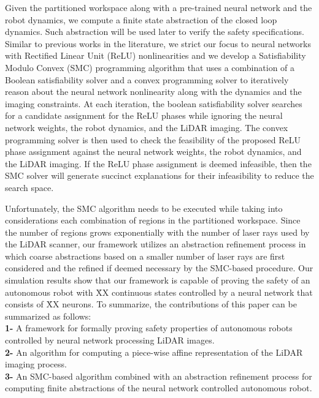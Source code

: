 
Given the partitioned workspace along with a pre-trained neural network and the robot dynamics, we compute a finite state abstraction of the closed loop dynamics. Such abstraction will be used later to verify the safety specifications. Similar to previous works in the literature, we strict our focus to neural networks with Rectified Linear Unit (ReLU) nonlinearities and we develop a Satisfiability Modulo Convex (SMC) programming algorithm that uses a combination of a Boolean satisfiability solver and a convex programming solver to iteratively reason about the neural network nonlinearity along with the dynamics and the imaging constraints. At each iteration, the boolean satisfiability solver searches for a candidate assignment for the ReLU phases while ignoring the neural network weights, the robot dynamics, and the LiDAR imaging. The convex programming solver is then used to check the feasibility of the proposed ReLU phase assignment against the neural network weights, the robot dynamics, and the LiDAR imaging. If the ReLU phase assignment is deemed infeasible, then the SMC solver will generate succinct explanations for their infeasibility to reduce the search space. 

Unfortunately, the SMC algorithm needs to be executed while taking into considerations each combination of regions in the partitioned workspace. Since the number of regions grows exponentially with the number of laser rays used by the LiDAR scanner, our framework utilizes an abstraction refinement process in which coarse abstractions based on a smaller number of laser rays are first considered and the refined if deemed necessary by the SMC-based procedure. Our simulation results show that our framework is capable of proving the safety of an autonomous robot with \r{XX} continuous states controlled by a neural network that consists of \r{XX} neurons. To summarize, the contributions of this paper can be summarized as follows:\\
\textbf{1-} A framework for formally proving safety properties of autonomous robots controlled by neural network processing LiDAR images.\\
\textbf{2-} An algorithm for computing a piece-wise affine representation of the LiDAR imaging process. \\
\textbf{3-} An SMC-based algorithm combined with an abstraction refinement process for computing finite abstractions of the neural network controlled autonomous robot.










